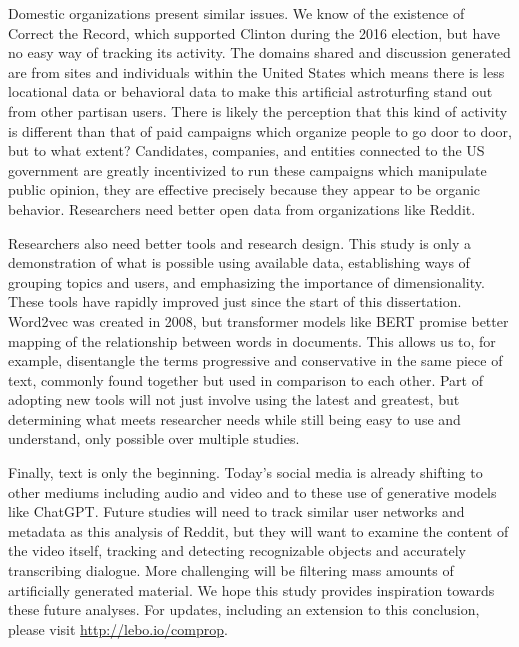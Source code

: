 \documentclass[doublespacing]{utdthesis}
\begin{document}
Domestic organizations present similar issues.
We know of the existence of Correct the Record, which supported Clinton during the 2016 election, but have no easy way of tracking its activity.
The domains shared and discussion generated are from sites and individuals within the United States which means there is less locational data or behavioral data to make this artificial astroturfing stand out from other partisan users.
There is likely the perception that this kind of activity is different than that of paid campaigns which organize people to go door to door, but to what extent?
Candidates, companies, and entities connected to the US government are greatly incentivized to run these campaigns which manipulate public opinion, they are effective precisely because they appear to be organic behavior.
Researchers need better open data from organizations like Reddit.

Researchers also need better tools and research design.
This study is only a demonstration of what is possible using available data, establishing ways of grouping topics and users, and emphasizing the importance of dimensionality.
These tools have rapidly improved just since the start of this dissertation.
Word2vec was created in 2008, but transformer models like BERT promise better mapping of the relationship between words in documents.
This allows us to, for example, disentangle the terms progressive and conservative in the same piece of text, commonly found together but used in comparison to each other.
Part of adopting new tools will not just involve using the latest and greatest, but determining what meets researcher needs while still being easy to use and  understand, only possible over multiple studies.

Finally, text is only the beginning.
Today's social media is already shifting to other mediums including audio and video and to these use of generative models like ChatGPT.
Future studies will need to track similar user networks and metadata as this analysis of Reddit, but they will want to examine the content of the video itself, tracking and detecting recognizable objects and accurately transcribing dialogue.
More challenging will be filtering mass amounts of artificially generated material.
We hope this study provides inspiration towards these future analyses.
For updates, including an extension to this conclusion, please visit \url{http://lebo.io/comprop}.

\begin{thesisbib}

\end{thesisbib}
\end{document}
